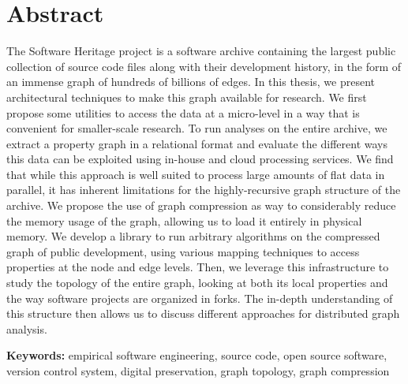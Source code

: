 \begin{minipage}[t][0.5\textheight][t]{0.96\textwidth}

\section*{Abstract}
\begin{SingleSpace}
    The Software Heritage project is a software archive containing the largest
    public collection of source code files along with their development history,
    in the form of an immense graph of hundreds of billions of edges. In this
    thesis, we present architectural techniques to make this graph available
    for research. We first propose some utilities to access the data at a
    micro-level in a way that is convenient for smaller-scale research.
    To run analyses on the entire archive, we extract a property graph in a
    relational format and evaluate the different ways this data can be
    exploited using in-house and cloud processing services.
    We find that while this approach is well suited to process large amounts of
    flat data in parallel, it has inherent limitations for the highly-recursive
    graph structure of the archive. We propose the use of graph compression as
    way to considerably reduce the memory usage of the graph, allowing us to
    load it entirely in physical memory. We develop a library to run arbitrary
    algorithms on the compressed graph of public development, using various
    mapping techniques to access properties at the node and edge levels.
    Then, we leverage this infrastructure to study the topology of the entire
    graph, looking at both its local properties and the way software projects
    are organized in forks. The in-depth understanding of this structure then
    allows us to discuss different approaches for distributed graph analysis.
\vspace{3mm}

\textbf{Keywords:} empirical software engineering, source code, open source
software, version control system, digital preservation, graph topology, graph
compression

\end{SingleSpace}
\end{minipage} \\


